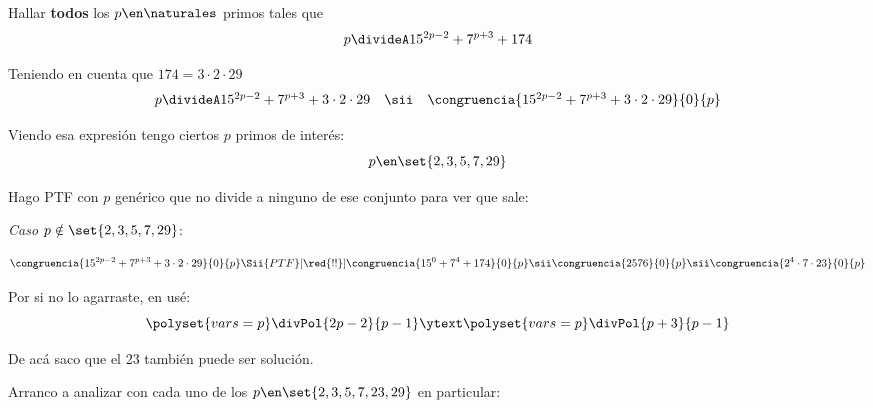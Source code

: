 \begin{enunciado}{\ejExtra}
  Hallar \textbf{todos} los $p \en \naturales$ primos tales que
  $$
    p \divideA 15^{2p-2} + 7^{p+3} + 174
  $$
\end{enunciado}

Teniendo en cuenta que $174 = 3 \cdot 2 \cdot 29$
$$
  \begin{array}{rcl}
    p \divideA 15^{2p-2} + 7^{p+3} + 3 \cdot 2 \cdot 29
     & \sii &
    \congruencia{15^{2p-2} + 7^{p+3} +3 \cdot 2 \cdot 29}{0}{p}
  \end{array}
$$

Viendo esa expresión tengo ciertos $p$ primos de interés:
$$
  p \en \set{2, 3, 5, 7, 29}
$$

Hago PTF con $p$ genérico que no divide a ninguno de ese conjunto para ver que sale:

\textit{Caso $p \notin\set{2, 3, 5, 7, 29}$}:\par
$$
  \congruencia{15^{2p-2} + 7^{p+3} +3 \cdot 2 \cdot 29}{0}{p}
  \Sii{PTF}[\red{!!}]
  \congruencia{15^0 + 7^4 + 174}{0}{p}
  \sii
  \congruencia{2576}{0}{p}
  \sii
  \congruencia{2^4 \cdot 7 \cdot 23}{0}{p}
$$

Por si no lo agarraste, en \red{!!} usé:
$$
  \polyset{vars=p}
  \divPol{2p - 2}{p-1}
  \ytext
  \polyset{vars=p}
  \divPol{p + 3}{p-1}
$$

De acá saco que el 23 también puede ser solución.\par
Arranco a analizar con cada uno de los  $p \en \set{2, 3, 5, 7, 23, 29}$ en particular:

